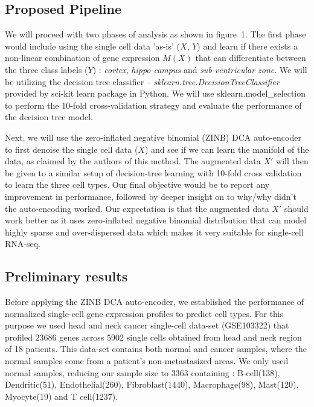 \subsection*{Proposed Pipeline}
We will proceed with two phases of analysis as shown in figure~1. The first phase would include using the single cell data 'as-is' ($X$, $Y$) and learn if there exists a non-linear combination of gene expression $M(X)$ that can differentiate between the three class labels ($Y$) : \textit{cortex}, \textit{hippo-campus} and  \textit{sub-ventricular zone}. We will be utilizing the decision tree classifier -- \textit{sklearn.tree.DecisionTreeClassifier} provided by sci-kit learn package in Python. We will use sklearn.model\_selection to perform the 10-fold cross-validation strategy and evaluate the performance of the decision tree model.

Next, we will use the zero-inflated negative binomial (ZINB) DCA auto-encoder \citep{eraslan2018single} to first denoise the single cell data ($X$) and see if we can learn the manifold of the data, as claimed by the authors of this method. The augmented data $X'$ will then be given to a similar setup of decision-tree learning with 10-fold cross validation to learn the three cell types. Our final objective would be to report any improvement in performance, followed by deeper insight on to why/why didn't the auto-encoding worked. Our expectation is that the augmented data $X'$ should work better as it uses zero-inflated negative binomial distribution that can model highly sparse and over-dispersed data \citep{eraslan2018single} which makes it very suitable for single-cell RNA-seq.

\subsection*{Preliminary results}
Before applying the ZINB DCA auto-encoder, we established the performance of normalized single-cell gene expression profiles to predict cell types. For this purpose we used head and neck cancer single-cell data-set (GSE103322) \citep{puram2017single} that profiled 23686 genes across 5902 single cells obtained from head and neck region of 18 patients. This data-set contains both normal and cancer samples, where the normal samples come from a patient's non-metastasized areas. We only used normal samples, reducing our sample size to 3363 containing :  B-cell(138), Dendritic(51), Endothelial(260),  Fibroblast(1440), Macrophage(98), Mast(120), Myocyte(19) and T cell(1237). 

